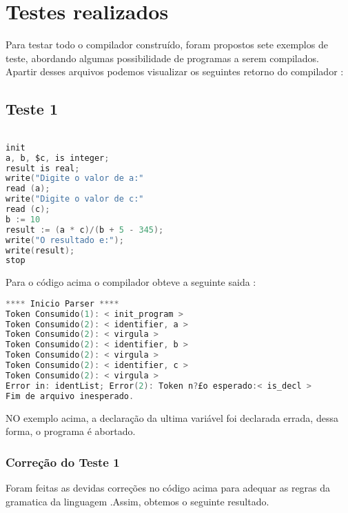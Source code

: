 \chapter{Testes realizados}
Para testar todo o compilador construído, foram propostos sete exemplos de teste, abordando algumas possibilidade de programas a serem compilados.
Apartir desses arquivos podemos visualizar os seguintes retorno do compilador :
\newline

\section{Teste 1}

\begin{lstlisting}[caption={Teste1.txt},label={lst:label},language=C]

init
a, b, $c, is integer;
result is real;
write("Digite o valor de a:"
read (a);
write("Digite o valor de c:"
read (c);
b := 10
result := (a * c)/(b + 5 - 345);
write("O resultado e:");
write(result);
stop


\end{lstlisting}\newline
Para o código acima  o compilador obteve a seguinte saida :

\begin{lstlisting}[caption={Saida para o Codigo de teste  : Teste1.txt},label={Entrada 1},language=C]
**** Inicio Parser ****
Token Consumido(1): < init_program >
Token Consumido(2): < identifier, a >
Token Consumido(2): < virgula >
Token Consumido(2): < identifier, b >
Token Consumido(2): < virgula >
Token Consumido(2): < identifier, c >
Token Consumido(2): < virgula >
Error in: identList; Error(2): Token n?£o esperado:< is_decl >
Fim de arquivo inesperado.


\end{lstlisting}\newline
NO exemplo acima, a declaração da ultima variável foi declarada errada, dessa forma, o programa é abortado.

\subsection{Correção do Teste 1}
Foram feitas as devidas correções no código acima para adequar as regras da gramatica da linguagem .Assim, obtemos o seguinte resultado.


